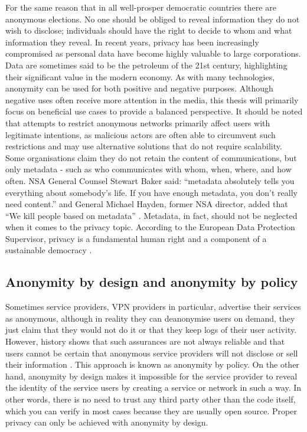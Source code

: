 For the same reason that in all well-prosper democratic countries there are anonymous elections. No one should be obliged to reveal information they do not wish to disclose; individuals should have the right to decide to whom and what information they reveal. In recent years, privacy has been increasingly compromised as personal data have become highly valuable to large corporations. Data are sometimes said to be the petroleum of the 21st century, highlighting their significant value in the modern economy.
As with many technologies, anonymity can be used for both positive and negative purposes. Although negative uses often receive more attention in the media, this thesis will primarily focus on beneficial use cases to provide a balanced perspective.
It should be noted that attempts to restrict anonymous networks primarily affect users with legitimate intentions, as malicious actors are often able to circumvent such restrictions and may use alternative solutions that do not require scalability.
Some organisations claim they do not retain the content of communications, but only metadata - such as who communicates with whom, when, where, and how often. NSA General Counsel Stewart Baker said: “metadata absolutely tells you everything about somebody’s life. If you have enough metadata, you don’t really need content.” and General Michael Hayden, former NSA director, added that “We kill people based on metadata” \cite{metadata-kill}. Metadata, in fact, should not be neglected when it comes to the privacy topic.
According to the European Data Protection Supervisor, privacy is a fundamental human right and a component of a sustainable democracy \cite{privacy-eu}.

\subsection{Anonymity by design and anonymity by policy}
Sometimes service providers, VPN providers in particular, advertise their services as anonymous, although in reality they can deanonymise users on demand, they just claim that they would not do it or that they keep logs of their user activity. However, history shows that such assurances are not always reliable and that users cannot be certain that anonymous service providers will not disclose or sell their information \cite{vpns}. This approach is known as anonymity by policy.
On the other hand, anonymity by design makes it impossible for the service provider to reveal the identity of the service users by creating a service or network in such a way. In other words, there is no need to trust any third party other than the code itself, which you can verify in most cases because they are usually open source. Proper privacy can only be achieved with anonymity by design.


